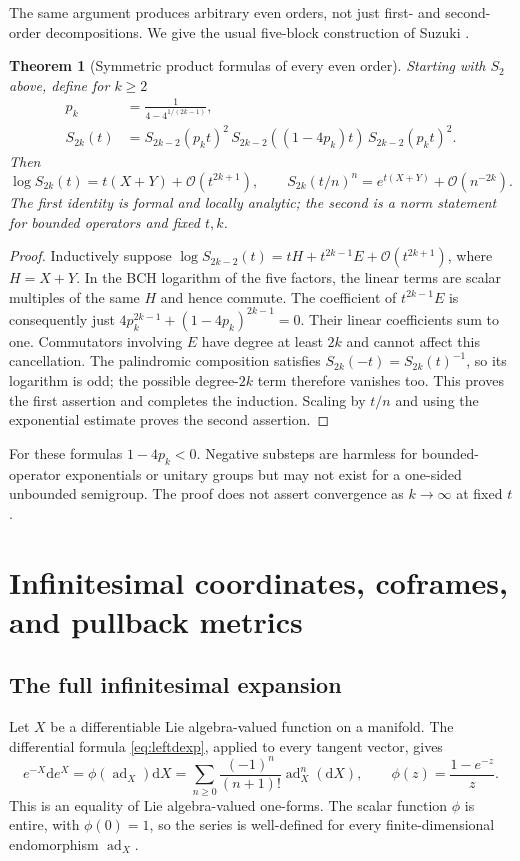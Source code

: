\documentclass[11pt]{article}
\newtheorem{theorem}{Theorem}[section]
\theoremstyle{definition}
\theoremstyle{remark}
\newcommand{\dd}{\mathrm d}
\newcommand{\ad}{\operatorname{ad}}
\newcommand{\smallO}{\mathcal O}
\numberwithin{equation}{section}
\begin{document}
The same argument produces arbitrary even orders, not just first- and second-order decompositions. We give the usual five-block construction of Suzuki \cite{suzuki}.
\begin{theorem}[Symmetric product formulas of every even order]\label{thm:suzuki}
Starting with $S_2$ above, define for $k\geq2$
\begin{align}
 p_k&=\frac1{4-4^{1/(2k-1)}},\label{eq:suzukip}\\
 S_{2k}(t)&=S_{2k-2}(p_kt)^2\,
       S_{2k-2}((1-4p_k)t)\,S_{2k-2}(p_kt)^2.\label{eq:suzuki}
\end{align}
Then
\begin{equation}\label{eq:suzukiorder}
 \log S_{2k}(t)=t(X+Y)+\smallO(t^{2k+1}),\qquad
 S_{2k}(t/n)^n=e^{t(X+Y)}+\smallO(n^{-2k}).
\end{equation}
The first identity is formal and locally analytic; the second is a norm statement for bounded operators and fixed $t,k$.
\end{theorem}
\begin{proof}
Inductively suppose $\log S_{2k-2}(t)=tH+t^{2k-1}E+\smallO(t^{2k+1})$, where $H=X+Y$. In the BCH logarithm of the five factors, the linear terms are scalar multiples of the same $H$ and hence commute. The coefficient of $t^{2k-1}E$ is consequently just
$4p_k^{2k-1}+(1-4p_k)^{2k-1}=0$. Their linear coefficients sum to one. Commutators involving $E$ have degree at least $2k$ and cannot affect this cancellation. The palindromic composition satisfies $S_{2k}(-t)=S_{2k}(t)^{-1}$, so its logarithm is odd; the possible degree-$2k$ term therefore vanishes too. This proves the first assertion and completes the induction. Scaling by $t/n$ and using the exponential estimate proves the second assertion.
\end{proof}
For these formulas $1-4p_k<0$. Negative substeps are harmless for bounded-operator exponentials or unitary groups but may not exist for a one-sided unbounded semigroup. The proof does not assert convergence as $k\to\infty$ at fixed $t$.

\section{Infinitesimal coordinates, coframes, and pullback metrics}\label{sec:geometry}
\subsection{The full infinitesimal expansion}
Let $X$ be a differentiable Lie algebra-valued function on a manifold. The differential formula \eqref{eq:leftdexp}, applied to every tangent vector, gives
\begin{equation}\label{eq:infinitesimal}
 e^{-X}\dd e^X=\phi(\ad_X)\dd X
       =\sum_{n\geq0}\frac{(-1)^n}{(n+1)!}\ad_X^n(\dd X),
 \qquad \phi(z)=\frac{1-e^{-z}}z.
\end{equation}
This is an equality of Lie algebra-valued one-forms. The scalar function $\phi$ is entire, with $\phi(0)=1$, so the series is well-defined for every finite-dimensional endomorphism $\ad_X$.
\end{document}
